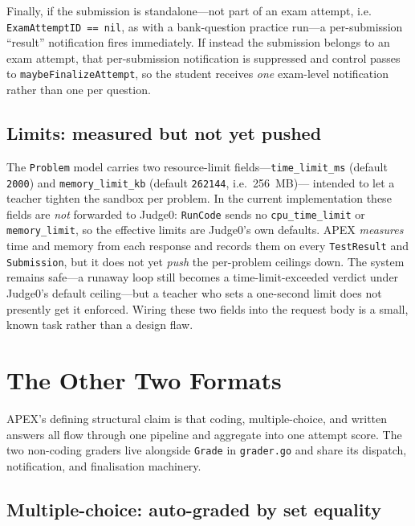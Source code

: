 Finally, if the submission is standalone---not part of an exam attempt, i.e.
\texttt{ExamAttemptID == nil}, as with a bank-question practice run---a per-submission ``result''
notification fires immediately. If instead the submission belongs to an exam attempt, that
per-submission notification is suppressed and control passes to \texttt{maybeFinalizeAttempt}, so
the student receives \emph{one} exam-level notification rather than one per question.

\subsection{Limits: measured but not yet pushed}\label{sec:grading-limits}

The \texttt{Problem} model carries two resource-limit fields---\texttt{time\_limit\_ms}
(default \texttt{2000}) and \texttt{memory\_limit\_kb} (default \texttt{262144}, i.e.\ 256~MB)---
intended to let a teacher tighten the sandbox per problem. In the current implementation these
fields are \emph{not} forwarded to Judge0: \texttt{RunCode} sends no \texttt{cpu\_time\_limit}
or \texttt{memory\_limit}, so the effective limits are Judge0's own defaults. APEX
\emph{measures} time and memory from each response and records them on every \texttt{TestResult}
and \texttt{Submission}, but it does not yet \emph{push} the per-problem ceilings down. The
system remains safe---a runaway loop still becomes a time-limit-exceeded verdict under Judge0's
default ceiling---but a teacher who sets a one-second limit does not presently get it enforced.
Wiring these two fields into the request body is a small, known task rather than a design flaw.

\section{The Other Two Formats}\label{sec:grading-other}

APEX's defining structural claim is that coding, multiple-choice, and written answers all flow
through one pipeline and aggregate into one attempt score. The two non-coding graders live
alongside \texttt{Grade} in \texttt{grader.go} and share its dispatch, notification, and
finalisation machinery.

\subsection{Multiple-choice: auto-graded by set equality}\label{sec:grading-mcq}

